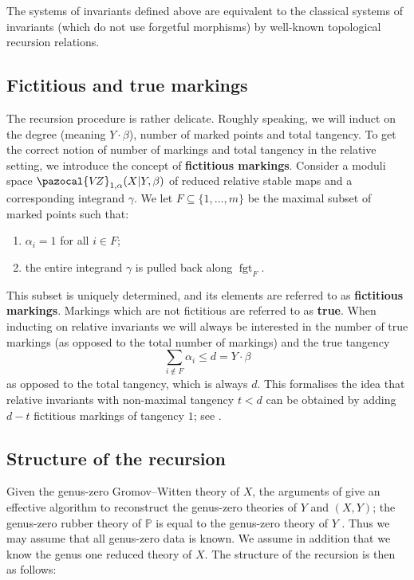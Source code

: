 \documentclass[11pt]{amsart}
\newcommand{\VZ}{\pazocal{V\!Z}}
\newcommand{\fgt}{\operatorname{fgt}}
\theoremstyle{definition}
\theoremstyle{definition}
\begin{document}
The systems of invariants defined above are equivalent to the classical systems of invariants (which do not use forgetful morphisms) by well-known topological recursion relations.

\subsection{Fictitious and true markings} The recursion procedure is rather delicate. Roughly speaking, we will induct on the degree (meaning $Y\cdot\beta$), number of marked points and total tangency. To get the correct notion of number of markings and total tangency in  the relative setting, we introduce the concept of \textbf{fictitious markings}. Consider a moduli space $\VZ_{1,\alpha}(X|Y,\beta)$ of reduced relative stable maps and a corresponding integrand $\gamma$. We let $F \subseteq \{1,\ldots,m\}$ be the maximal subset of marked points such that:
\begin{enumerate}
\item $\alpha_i = 1$ for all $i \in F$;
\item the entire integrand $\gamma$ is pulled back along $\fgt_F$.
\end{enumerate}
This subset is uniquely determined, and its elements are referred to as \textbf{fictitious markings}. Markings which are not fictitious are referred to as \textbf{true}. When inducting on relative invariants we will always be interested in the number of true markings (as opposed to the total number of markings) and the true tangency
\begin{equation*} \sum_{i \not\in F} \alpha_i \leq d=Y\cdot \beta \end{equation*}
as opposed to the total tangency, which is always $d$. This formalises the idea that relative invariants with non-maximal tangency $t<d$ can be obtained by adding $d-t$ fictitious markings of tangency $1$; see \cite[Lemma 1.15(i)]{Ga}.

\subsection{Structure of the recursion} Given the genus-zero Gromov--Witten theory of $X$, the arguments of \cite{Ga} give an effective algorithm to reconstruct the genus-zero theories of $Y$ and $(X,Y)$; the genus-zero rubber theory of $\mathbb{P}$ is equal to the genus-zero theory of $Y$ \cite{GathmannThesis}. Thus we may assume that all genus-zero data is known. We assume in addition that we know the genus one reduced theory of $X$. The structure of the recursion is then as follows:
\end{document}
